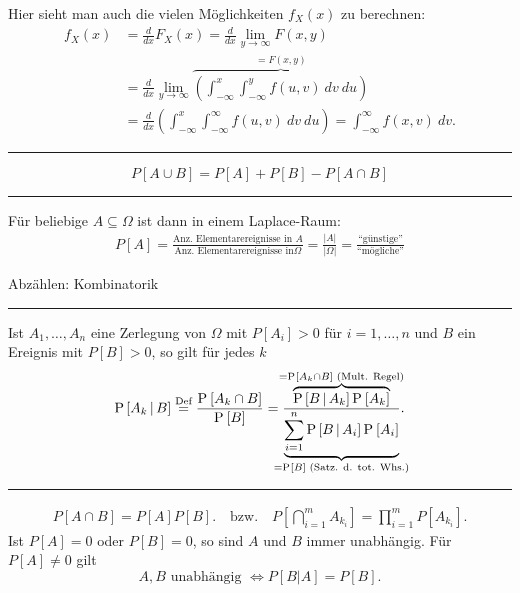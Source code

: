 \documentclass[a4paper, 12pt]{extarticle}
\newcommand{\sep}{\vspace{5pt}\noindent\hrule\vspace{5pt}}
\newcommand{\card}[1]{\left\lvert #1 \right\rvert}
\newcommand{\Prob}[2][]{\operatorname{P}_{#1}\left[ #2 \right]}
\newcommand{\cProb}[2]{\operatorname{P}\left[ #1 \,\middle|\, #2 \right]}
\begin{document}
\begin{multicols*}{2}

\raggedcolumns

Hier sieht man auch die vielen Möglichkeiten $f_X(x)$ zu berechnen:
\begin{align*}
f_X(x) &= \frac{d}{dx} F_X(x) = \frac{d}{dx}\lim_{y\to\infty} F(x,y)
\\
&=\frac{d}{dx}\lim_{y\to\infty}\overbrace{\left(\int_{-\infty}^x\int_{-\infty}^y
f(u,v) \ dv \ du\right)}^{=F(x,y)} 
\\
&=\frac{d}{dx}\left(\int_{-\infty}^x\int_{-\infty}^\infty f(u,v)
\ dv \ du\right)
=\int_{-\infty}^\infty f(x,v) \ dv.
\end{align*}

\sep

\Thm[Additionsregel]
  \[
  P[A\cup B] = P[A] + P[B] - P[A\cap B]
  \]

\sep

\Lem Für beliebige $A\subseteq\Omega$ ist dann in einem Laplace-Raum:
\begin{gather*}
P[A]=\frac{\text{Anz. Elementarereignisse in }A}{\text{Anz. Elementarereignisse
in
}\Omega}=\frac{\card{A}}{\card{\Omega}}
=\frac{\text{``günstige''}}{\text{``mögliche''}}
\end{gather*}

\Com Abzählen: Kombinatorik

\sep

 Ist $A_1,\ldots,A_n$ eine Zerlegung von $\Omega$ mit
$P[A_i]>0$ für $i=1,\ldots,n$ und $B$ ein Ereignis mit $P[B]>0$, so gilt für
jedes $k$
\[
\cProb{A_k}{B} \stackrel{\text{Def}}{=}
\frac{\Prob{A_k\cap B}}{\Prob{B}} 
=
\frac{\overbrace{\cProb{B}{A_k}\Prob{A_k}}^{\mathclap{=\Prob{A_k\cap
B}\text{
(Mult. Regel)}}}}{\underbrace{\sum_{i=1}^{n}
\cProb{B}{A_i}\Prob{A_i}}_{\mathclap{=\Prob{B}\text{
(Satz. d. tot. Whs.)}}}}.
\]

\sep

\begin{gather*}
P[A\cap B] = P[A]P[B]. \quad\text{bzw.}\quad P\left[\bigcap_{i=1}^{m}
A_{k_i}\right] =
\prod_{i=1}^{m} P[A_{k_i}].
\end{gather*}
Ist $P[A]=0$ oder $P[B]=0$, so sind $A$ und $B$ immer unabhängig. Für $P[A]\neq
0$ gilt
\[
A,B\text{ unabhängig } \Longleftrightarrow P[B|A] = P[B].
\]

\begin{comment}
\newpage

\part{Leftovers}


\end{comment}
\end{multicols*}
\end{document}
